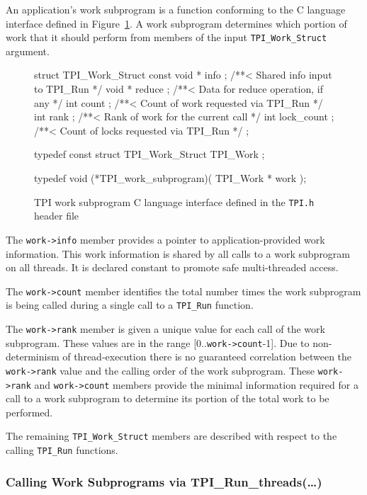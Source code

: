 An application's work subprogram is a function conforming to the C language interface defined in Figure~\ref{fig:WorkSubprogram}.
%
A work subprogram determines which portion of work that it should perform from members of the input 
\texttt{TPI\_Work\_Struct} argument.
%
\begin{figure}[h]
\center
\small
\begin{boxedverbatim}
struct TPI_Work_Struct {
  const void * info ;       /**< Shared info input to TPI_Run         */
  void       * reduce ;     /**< Data for reduce operation, if any    */
  int          count ;      /**< Count of work requested via TPI_Run  */
  int          rank ;       /**< Rank  of work for the current call   */
  int          lock_count ; /**< Count of locks requested via TPI_Run */
};

typedef const struct TPI_Work_Struct TPI_Work ;

typedef void (*TPI_work_subprogram)( TPI_Work * work );
\end{boxedverbatim}
\caption{TPI work subprogram C language interface defined in the \texttt{TPI.h} header file}
\label{fig:WorkSubprogram}
\end{figure}
%
\begin{blist}
\item The \texttt{work->info} member provides a pointer to application-provided work information.  This work information is shared by all calls to a work subprogram on all threads.  It is declared constant to promote safe multi-threaded access.
%
\item The \texttt{work->count} member identifies the total number times the work subprogram is being called during a single call to a \texttt{TPI\_Run} function.
%
\item The \texttt{work->rank} member is given a unique value for each call of the work subprogram.  These values are in the range \mbox{[0..\texttt{work->count}-1]}.  
Due to non-determinism of thread-execution there is no guaranteed correlation between the 
\texttt{work->rank} value and the calling order of the work subprogram.
These \texttt{work->rank} and \texttt{work->count} members provide the minimal information required for a call to a work subprogram to determine its portion of the total work to be performed.
%
\end{blist}
%
The remaining \texttt{TPI\_Work\_Struct} members are described with respect to the calling \texttt{TPI\_Run} functions.

\clearpage
\subsubsection{Calling Work Subprograms via TPI\_Run\_threads(\ldots)}

